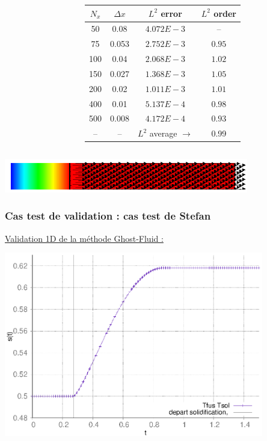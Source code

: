 \documentclass{beamer}
\begin{document}
\begin{frame}
\begin{columns}
\begin{column}{0.5 \textwidth}
\end{column}
    \begin{column}{0.5 \textwidth}
\begin{table}
	\scriptsize
		\begin{tabular}{|c|c||cc|}
			\hline
			$N_x$ & $\Delta x$ & $L^2$ error & $L^2$ order \\
			\hline
			\hline
			50 	& 0.08  & $4.072E-3$ & --  \\
			75  & 0.053 & $2.752E-3$ & $0.95$  \\
			100 & 0.04  & $2.068E-3$ & $1.02$   \\
			150 & 0.027 & $1.368E-3$ & $1.05$   \\
			200 & 0.02  & $1.011E-3$ & $1.01$   \\
			400 & 0.01  & $5.137E-4$ & $0.98$   \\
			500 & 0.008 & $4.172E-4$ & $0.93$  \\
			\hline
			-- & --     &  $L^2$ average  $\rightarrow$ & 0.99 \\
			\hline
		\end{tabular}
\end{table}

   \end{column}
   \end{columns}

\center \includegraphics[width=0.8\textwidth]{Figures/avantApresRhoDiff0000.png}
\end{frame}
\begin{frame}
    \frametitle{Cas test de validation : cas test de Stefan}
	\scriptsize
	\color{cea_rouge}\underline{Validation 1D de la méthode Ghost-Fluid :}\color{cea_texte}\\
	\begin{center}

\includegraphics[width=0.85\textwidth]{Figures/StefanTFusTSol.eps}
\end{center}
	\end{frame}
\end{document}
